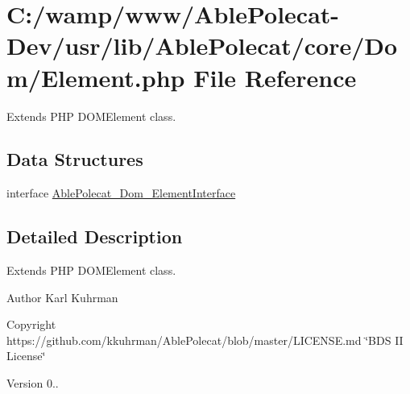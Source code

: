 \hypertarget{_element_8php}{}\section{C\+:/wamp/www/\+Able\+Polecat-\/\+Dev/usr/lib/\+Able\+Polecat/core/\+Dom/\+Element.php File Reference}
\label{_element_8php}


Extends P\+H\+P D\+O\+M\+Element class.  


\subsection*{Data Structures}
\begin{DoxyCompactItemize}
\item 
interface \hyperlink{interface_able_polecat___dom___element_interface}{Able\+Polecat\+\_\+\+Dom\+\_\+\+Element\+Interface}
\end{DoxyCompactItemize}


\subsection{Detailed Description}
Extends P\+H\+P D\+O\+M\+Element class. 

\begin{DoxyAuthor}{Author}
Karl Kuhrman 
\end{DoxyAuthor}
\begin{DoxyCopyright}{Copyright}
https\+://github.com/kkuhrman/\+Able\+Polecat/blob/master/\+L\+I\+C\+E\+N\+S\+E.\+md \char`\"{}\+B\+D\+S I\+I License\char`\"{} 
\end{DoxyCopyright}
\begin{DoxyVersion}{Version}
0.. 
\end{DoxyVersion}
